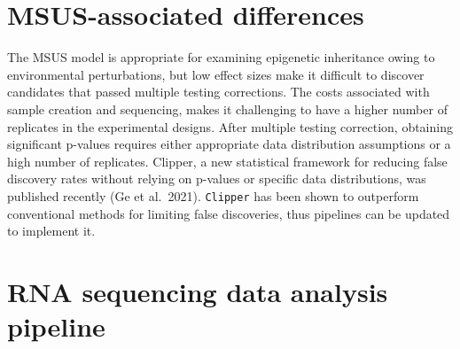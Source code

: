 \documentclass[12pt,twoside]{reedthesis}
\begin{document}
\hypertarget{msus-associated-differences}{%
\section*{MSUS-associated differences}\label{msus-associated-differences}}

The MSUS model is appropriate for examining epigenetic inheritance owing to environmental perturbations, but low effect sizes make it difficult to discover candidates that passed multiple testing corrections. The costs associated with sample creation and sequencing, makes it challenging to have a higher number of replicates in the experimental designs. After multiple testing correction, obtaining significant p-values requires either appropriate data distribution assumptions or a high number of replicates. Clipper, a new statistical framework for reducing false discovery rates without relying on p-values or specific data distributions, was published recently (Ge et al.~2021). \texttt{Clipper} has been shown to outperform conventional methods for limiting false discoveries, thus pipelines can be updated to implement it.

\hypertarget{rna-sequencing-data-analysis-pipeline}{%
\section*{RNA sequencing data analysis pipeline}\label{rna-sequencing-data-analysis-pipeline}}
\end{document}
